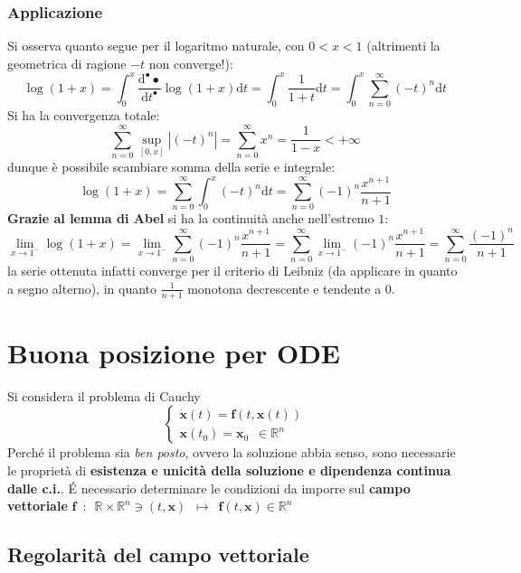 \documentclass[10pt, oneside]{book}
\theoremstyle{plain}
\begin{document}
\subsubsection{Applicazione}
Si osserva quanto segue per il logaritmo naturale, con $0 < x < 1$ (altrimenti la geometrica di ragione $-t$ non converge!):
\[ \log(1+x) = \int_{0}^{x}\frac{\textrm{d}^{•} •}{\textrm{d}t^{•}} \log(1+x)\textrm{d}t = \int_{0}^{x}\frac{1}{1+t}\textrm{d}t = \int_0^x \sum\limits_{n=0}^\infty (-t)^n \textrm{d}t\]
Si ha la convergenza totale:
\[\sum\limits_{n=0}^\infty \sup\limits_{[0,x]} |(-t)^n| = \sum\limits_{n=0}^\infty x^n = \frac{1}{1-x} < +\infty\]
dunque è possibile scambiare somma della serie e integrale:
\[\log(1+x) = \sum\limits_{n=0}^\infty \int_{0}^{x}(-t)^n\textrm{d}t = \sum\limits_{n=0}^\infty (-1)^n \frac{x^{n+1}}{n+1}\]
\textbf{Grazie al lemma di Abel} si ha la continuità anche nell'estremo $1$:
\[\lim\limits_{x \rightarrow 1^-} \log(1+x) = \lim\limits_{x \rightarrow 1^-} \sum\limits_{n=0}^\infty (-1)^n \frac{x^{n+1}}{n+1} = \sum\limits_{n=0}^\infty \lim\limits_{x \rightarrow 1^-} (-1)^n \frac{x^{n+1}}{n+1} = \sum\limits_{n=0}^\infty \frac{(-1)^n}{n+1}\]
la serie ottenuta infatti converge per il criterio di Leibniz (da applicare in quanto a segno alterno), in quanto $\frac{1}{n+1}$ monotona decrescente e tendente a $0$.

\section{Buona posizione per ODE}
Si considera il problema di Cauchy
\[\begin{cases}
\dot{\mathbf{x}}(t) = \mathbf{f}(t, \mathbf{x}(t))\\
\mathbf{x}(t_0) = \mathbf{x}_0 \enspace \in \mathbb{R}^n
\end{cases}\]
Perché il problema sia \textit{ben posto}, ovvero la soluzione abbia senso, sono necessarie le proprietà di \textbf{esistenza e unicità della soluzione e dipendenza continua dalle c.i.}. \'E necessario determinare le condizioni da imporre sul \textbf{campo vettoriale} $\displaystyle \mathbf{f} \enspace : \enspace \mathbb{R} \times \mathbb{R}^n \owns (t, \mathbf{x}) \enspace \longmapsto \enspace \mathbf{f}(t, \mathbf{x}) \in \mathbb{R}^n$

\subsection{Regolarità del campo vettoriale}
\end{document}
